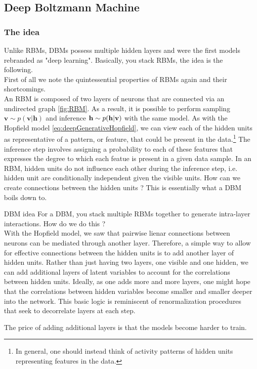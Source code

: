 \subsection{Deep Boltzmann Machine}
\label{subsec:deepGenerativeDBM}
\subsubsection{The idea}
Unlike RBMs, DBMs possess multiple hidden layers and were the first models rebranded as "deep learning".
Basically, you stack RBMs, the idea is the following.\\
First of all we note the quintessential properties of RBMs again and their shortcomings.\\
An RBM is composed of two layers of neurons that are connected via an undirected graph \ref{fig:RBM}. As a result, it is possible to perform sampling $\mathbf{v}\sim p(\mathbf{v|h})$ and inference $\mathbf{h} \sim p(\mathbf{h}|\mathbf{v})$ with the same model. As with the Hopfield model \ref{eq:deepGenerativeHopfield}, we can view each of the hidden units as representative of a pattern, or feature, that could be present in the data.\footnote{In general, one should instead think of activity patterns of hidden units representing features in the data.} The inference step involves assigning a probability to each of these features that expresses the degree to which each featue is present in a given data sample. In an RBM, hidden units do not influence each other during the inference step, i.e. hidden unit are conditionally independent given the visible units. How can we create connections between the hidden units ? This is essentially what a DBM boils down to.
\begin{mybox}{DBM idea}
	For a DBM, you stack multiple RBMs together to generate intra-layer interactions. How do we do this ?\\
	With the Hopfield model, we saw that pairwise lienar connections between neurons can be mediated through another layer. Therefore, a simple way to allow for effective connections between the hidden units is to add another layer of hidden units. Rather than just having two layers, one visible and one hidden, we can add additional layers of latent variables to account for the correlations between hidden units. Ideally, as one adds more and more layers, one might hope that the correlations between hidden variables become smaller and smaller deeper into the network. This basic logic is reminiscent of renormalization procedures that seek to decorrelate layers at each step.
\end{mybox}
The price of adding additional layers is that the models become harder to train.
